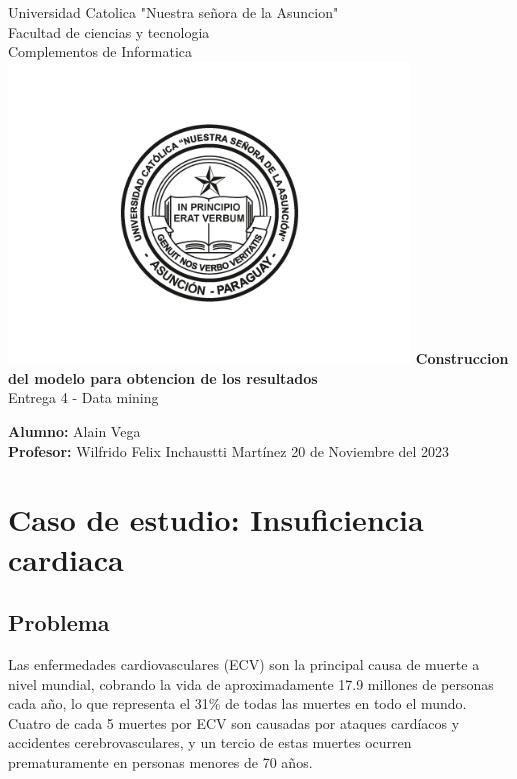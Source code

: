 \documentclass[12pt, letterpaper]{article}
\begin{document}
\begin{titlepage}
  \begin{center}
      \Large{Universidad Catolica "Nuestra señora de la Asuncion" \\
      Facultad de ciencias y tecnologia \\
      Complementos de Informatica}
      \includegraphics[width=0.8\textwidth]{UcaLogo.jpg}
      \LARGE{\textbf{Construccion del modelo para obtencion de los resultados
      }} \\
      \Large{Entrega 4 - Data mining}
      \vspace{1cm}
  \end{center}
      \large
      \textbf{Alumno: }Alain Vega \\
      \textbf{Profesor: }Wilfrido Felix Inchaustti Martínez
      \vfill
      \hfill{20 de Noviembre del 2023}
\end{titlepage}


\newpage
\tableofcontents %
\newpage

\section{Caso de estudio: Insuficiencia cardiaca}
\subsection{Problema}
Las enfermedades cardiovasculares (ECV) son la principal causa de muerte a nivel mundial, 
cobrando la vida de aproximadamente 17.9 millones de personas cada año, 
lo que representa el 31\% de todas las muertes en todo el mundo. 
Cuatro de cada 5 muertes por ECV son causadas por ataques cardíacos y accidentes cerebrovasculares, 
y un tercio de estas muertes ocurren prematuramente en personas menores de 70 años. 
\end{document}
